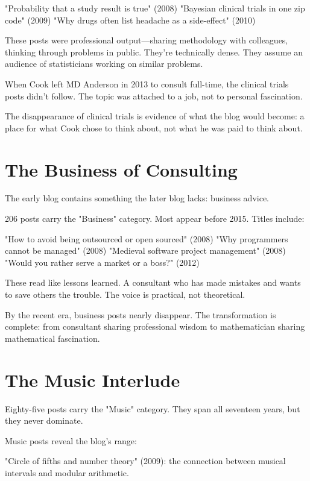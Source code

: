 "Probability that a study result is true" (2008)
"Bayesian clinical trials in one zip code" (2009)
"Why drugs often list headache as a side-effect" (2010)

These posts were professional output---sharing methodology with colleagues, thinking through problems in public. They're technically dense. They assume an audience of statisticians working on similar problems.

When Cook left MD Anderson in 2013 to consult full-time, the clinical trials posts didn't follow. The topic was attached to a job, not to personal fascination.

The disappearance of clinical trials is evidence of what the blog would become: a place for what Cook chose to think about, not what he was paid to think about.

\bigskip

\section*{The Business of Consulting}

The early blog contains something the later blog lacks: business advice.

206 posts carry the "Business" category. Most appear before 2015. Titles include:

"How to avoid being outsourced or open sourced" (2008)
"Why programmers cannot be managed" (2008)
"Medieval software project management" (2008)
"Would you rather serve a market or a boss?" (2012)

These read like lessons learned. A consultant who has made mistakes and wants to save others the trouble. The voice is practical, not theoretical.

By the recent era, business posts nearly disappear. The transformation is complete: from consultant sharing professional wisdom to mathematician sharing mathematical fascination.

\bigskip

\section*{The Music Interlude}

Eighty-five posts carry the "Music" category. They span all seventeen years, but they never dominate.

Music posts reveal the blog's range:

"Circle of fifths and number theory" (2009): the connection between musical intervals and modular arithmetic.

